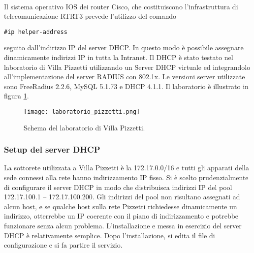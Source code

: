 \paragraph{} Il sistema operativo IOS dei router Cisco, che costituiscono l'infrastruttura di telecomunicazione RTRT3 prevede l'utilizzo del comando 
\begin{lstlisting}
#ip helper-address 
\end{lstlisting} 
seguito dall'indirizzo IP del server DHCP. In questo modo è possibile assegnare dinamicamente indirizzi IP in tutta la Intranet.
Il DHCP è stato testato nel laboratorio di Villa Pizzetti utilizzando un Server DHCP virtuale ed integrandolo all'implementazione del server RADIUS con 802.1x. Le versioni server utilizzate sono FreeRadius 2.2.6, MySQL 5.1.73 e DHCP 4.1.1.
Il laboratorio è illustrato in figura \ref{fig:lab}. 

\begin{figure}[ht]
  \texttt{[image: laboratorio\_pizzetti.png]}
  \caption{Schema del laboratorio di Villa Pizzetti.}
  \label{fig:lab}
\end{figure}

\subsubsection{Setup del server DHCP}  
La sottorete utilizzata a Villa Pizzetti è la 172.17.0.0/16 e tutti gli apparati della sede connessi alla rete hanno indirizzamento IP fisso.
Si è scelto prudenzialmente di configurare il server DHCP in modo che distribuisca indirizzi IP del pool 172.17.100.1 – 172.17.100.200. Gli indirizzi del pool non risultano assegnati ad alcun host, e se qualche host sulla rete Pizzetti richiedesse dinamicamente un indirizzo, otterrebbe un IP coerente con il piano di indirizzamento e potrebbe funzionare senza alcun problema. L'installazione e messa in esercizio del server DHCP è relativamente semplice. Dopo l'installazione, si edita il file di configurazione e si fa partire il servizio. \\


